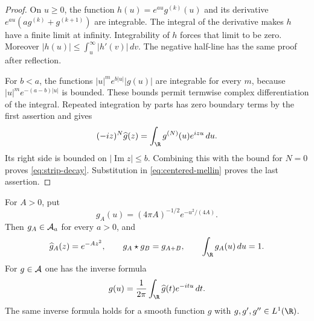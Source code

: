 \begin{proof}
On $u\geq0$, the function $h(u)=e^{au}g^{(k)}(u)$ and its derivative
$e^{au}(ag^{(k)}+g^{(k+1)})$ are integrable.
The integral of the derivative makes $h$ have a finite limit at infinity.
Integrability of $h$ forces that limit to be zero.
Moreover $|h(u)|\leq\int_u^\infty|h'(v)|\,dv$.
The negative half-line has the same proof after reflection.

For $b<a$, the functions $|u|^m e^{b|u|}|g(u)|$ are integrable for every
$m$, because $|u|^m e^{-(a-b)|u|}$ is bounded.
These bounds permit termwise complex differentiation of the integral.
Repeated integration by parts has zero boundary terms by the first assertion
and gives
\[
 (-iz)^N\widehat g(z)=\int_{\R}g^{(N)}(u)e^{izu}\,du.
\]
Its right side is bounded on $|\operatorname{Im}z|\leq b$.
Combining this with the bound for $N=0$ proves \eqref{eq:strip-decay}.
Substitution in \eqref{eq:centered-mellin} proves the last assertion.
\end{proof}

\begin{lemma}
\label{lem:gaussian}
For $A>0$, put
\[
 g_A(u)=(4\pi A)^{-1/2}e^{-u^2/(4A)}.
\]
Then $g_A\in\mathcal A_a$ for every $a>0$, and
\begin{equation}
 \widehat g_A(z)=e^{-Az^2},\qquad
 g_A\star g_B=g_{A+B},\qquad \int_{\R}g_A(u)\,du=1.
 \label{eq:gaussian}
\end{equation}
For $g\in\mathcal A$ one has the inverse formula
\begin{equation}
 g(u)=\frac1{2\pi}\int_{\R}\widehat g(t)e^{-itu}\,dt.
 \label{eq:inverse}
\end{equation}
The same inverse formula holds for a smooth function $g$ with
$g,g',g''\in L^1(\R)$.
\end{lemma}

